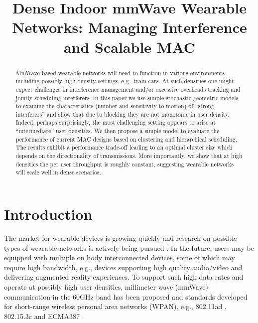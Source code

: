 \documentclass[10pt, conference, letterpaper]{IEEEtran}
\begin{document}
\title{Dense Indoor mmWave Wearable Networks: Managing Interference and Scalable MAC}

\author{
}

\maketitle

\begin{abstract}

MmWave based wearable networks will need to function in various environments including possibly high density settings, e.g., train cars. 
At such densities one might expect challenges in interference management and/or excessive overheads tracking and jointly scheduling interferers. 
In this paper we use simple stochastic geometric models to examine the characteristics (number and sensitivity to motion) of ``strong interferers'' and show that due to blocking they are not monotonic in user density. 
Indeed, perhaps surprisingly, the most challenging setting appears to arise at ``intermediate'' user densities. 
We then propose a simple model to evaluate the performance of current MAC designs based on clustering and hierarchical scheduling. 
The results exhibit a performance trade-off leading to an optimal cluster size which depends on the directionality of transmissions. 
More importantly, we show that at high densities the per user throughput is roughly constant, suggesting wearable networks will scale well in dense scenarios.

\end{abstract}
\IEEEpeerreviewmaketitle

\section{Introduction}\label{section:introduction}
The market for wearable devices is growing quickly and research on possible types of wearable networks is actively being pursued \cite{wearable}. 
In the future, users may be equipped with multiple on body interconnected devices, some of which may require high bandwidth, e.g., devices supporting high quality audio/video and delivering augmented reality experiences. 
To support such high data rates and operate at possibly high user densities, millimeter wave (mmWave) communication in the 60GHz band has been proposed and standards developed for short-range wireless personal area networks (WPAN), e.g., 802.11ad \cite{80211ad}, 802.15.3c \cite{802153c} and ECMA387 \cite{ECMA387}.
\end{document}
